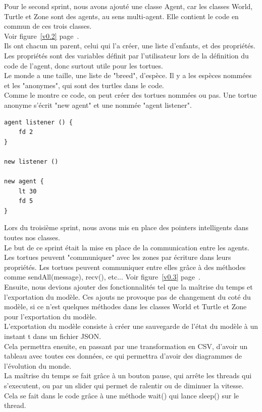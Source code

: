Pour le second sprint, nous avons ajouté une classe Agent, car les classes World, Turtle et Zone sont des agents, au sens multi-agent. Elle contient le code en commun de ces trois classes.\\
 Voir figure~\ref{v0.2} page~\pageref{v0.2}.\\ 
Ils ont chacun un parent, celui qui l'a créer, une liste d'enfants, et des propriétés. Les propriétés sont des variables définit par l'utilisateur lors de la définition du code de l'agent, donc surtout utile pour les tortues.\\
Le monde a une taille, une liste de "breed", d'espèce. Il y a les espèces nommées et les "anonymes", qui sont des turtles dans le code.\\
Comme le montre ce code, on peut créer des tortues nommées ou pas. Une tortue anonyme s'écrit "new agent" et une nommée "agent listener".\\
\begin{lstlisting}
agent listener () {
	fd 2
}

new listener ()

new agent {
	lt 30
	fd 5
}
\end{lstlisting}
Lors du troisième sprint, nous avons mis en place des pointers intelligents dans toutes nos classes.\\
Le but de ce sprint était la mise en place de la communication entre les agents. Les tortues peuvent "communiquer" avec les zones par écriture dans leurs propriétés. Les tortues peuvent communiquer entre elles grâce à des méthodes comme sendAll(message), recv(), etc...
Voir figure~\ref{v0.3} page~\pageref{v0.3}.\\

Ensuite, nous devions ajouter des fonctionnalités tel que la maîtrise du temps et l'exportation du modèle. Ces ajouts ne provoque pas de changement du coté du modèle, si ce n'est quelques méthodes dans les classes World et Turtle et Zone pour l'exportation du modèle.\\
L'exportation du modèle consiste à créer une sauvegarde de l'état du modèle à un instant t dans un fichier JSON.\\
Cela permettra ensuite, en passant par une transformation en CSV, d'avoir un tableau avec toutes ces données, ce qui permettra d'avoir des diagrammes de l'évolution du monde.\\

La maîtrise du temps se fait grâce à un bouton pause, qui arrête les threads qui s'executent, ou par un slider qui permet de ralentir ou de diminuer la vitesse. Cela se fait dans le code grâce à une méthode wait() qui lance sleep() sur le thread.\\

